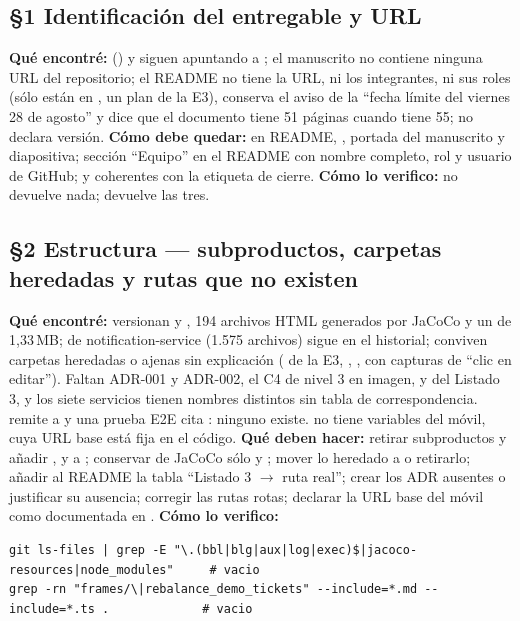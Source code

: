 \subsection*{\S1 Identificaci\'on del entregable y URL}
\textbf{Qu\'e encontr\'e:}  () y  siguen apuntando a ; el manuscrito no contiene ninguna URL del repositorio; el README no tiene la URL, ni los integrantes, ni sus roles (s\'olo est\'an en , un plan de la E3), conserva el aviso de la ``fecha l\'imite del viernes 28 de agosto'' y dice que el documento tiene 51 p\'aginas cuando tiene 55;  no declara versi\'on. \textbf{C\'omo debe quedar:}  en README, , portada del manuscrito y diapositiva; secci\'on ``Equipo'' en el README con nombre completo, rol y usuario de GitHub;  y  coherentes con la etiqueta de cierre. \textbf{C\'omo lo verifico:}  no devuelve nada;  devuelve las tres.

\subsection*{\S2 Estructura --- subproductos, carpetas heredadas y rutas que no existen}
\textbf{Qu\'e encontr\'e:} versionan  y , 194 archivos HTML generados por JaCoCo y un  de 1,33\,MB;  de notification-service (1.575 archivos) sigue en el historial; conviven carpetas heredadas o ajenas sin explicaci\'on ( de la E3, , ,  con capturas de ``clic en editar''). Faltan ADR-001 y ADR-002, el C4 de nivel 3 en imagen,  y  del Listado 3, y los siete servicios tienen nombres distintos sin tabla de correspondencia.  remite a  y una prueba E2E cita : ninguno existe.  no tiene variables del m\'ovil, cuya URL base  est\'a fija en el c\'odigo. \textbf{Qu\'e deben hacer:} retirar subproductos y a\~nadir ,  y  a ; conservar de JaCoCo s\'olo  y ; mover lo heredado a  o retirarlo; a\~nadir al README la tabla ``Listado 3 $\rightarrow$ ruta real''; crear los ADR ausentes o justificar su ausencia; corregir las rutas rotas; declarar la URL base del m\'ovil como  documentada en . \textbf{C\'omo lo verifico:}\begin{verbatim}
git ls-files | grep -E "\.(bbl|blg|aux|log|exec)$|jacoco-resources|node_modules"     # vacio
grep -rn "frames/\|rebalance_demo_tickets" --include=*.md --include=*.ts .             # vacio
\end{verbatim}

